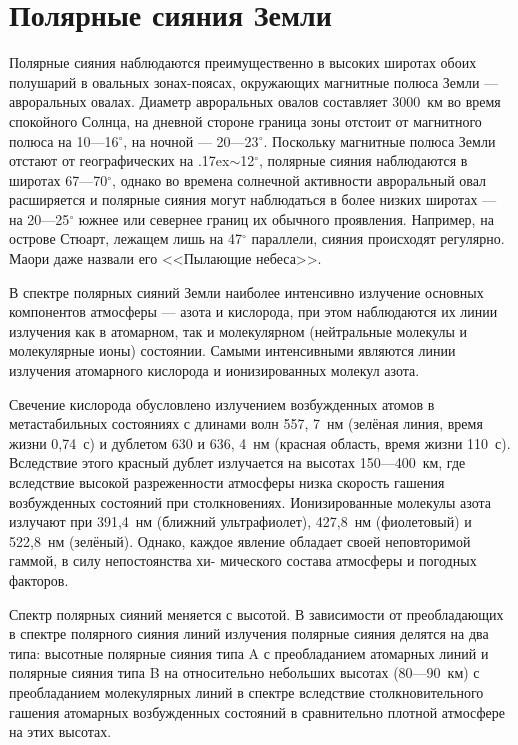 \documentclass[a4paper,14pt]{article}
\newcommand{\tilda}{\raise.17ex\hbox{$\scriptstyle\sim$}}
\begin{document}
\section{Полярные сияния Земли}

Полярные сияния наблюдаются преимущественно в высоких широтах обоих полушарий в овальных зонах-поясах, окружающих магнитные полюса Земли — авроральных овалах. Диаметр авроральных овалов составляет 3000~км во время спокойного Солнца, на дневной стороне граница зоны отстоит от магнитного полюса на 10—16$^\circ$, на ночной — 20—23$^\circ$. Поскольку магнитные полюса Земли отстают от географических на \tilda12$^\circ$, полярные сияния наблюдаются в широтах 67—70$^\circ$, однако во времена солнечной активности авроральный овал расширяется и полярные сияния могут наблюдаться в более низких широтах — на 20—25$^\circ$ южнее или севернее границ их обычного проявления. Например, на острове Стюарт, лежащем лишь на 47$^\circ$ параллели, сияния происходят регулярно. Маори даже назвали его <<Пылающие небеса>>.

В спектре полярных сияний Земли наиболее интенсивно излучение основных компонентов атмосферы — азота и кислорода, при этом наблюдаются их линии излучения как в атомарном, так и молекулярном (нейтральные молекулы и молекулярные ионы) состоянии. Самыми интенсивными являются линии излучения атомарного кислорода и ионизированных молекул азота.

Свечение кислорода обусловлено излучением возбужденных атомов в метастабильных состояниях с длинами волн 557, 7~нм (зелёная линия, время жизни 0,74~с) и дублетом 630 и 636, 4~нм (красная область, время жизни 110~с). Вследствие этого красный дублет излучается на высотах 150—400~км, где вследствие высокой разреженности атмосферы низка скорость гашения возбужденных состояний при столкновениях. Ионизированные молекулы азота излучают при 391,4~нм (ближний ультрафиолет), 427,8~нм (фиолетовый) и 522,8~нм (зелёный). Однако, каждое явление обладает своей неповторимой гаммой, в силу непостоянства хи-
мического состава атмосферы и погодных факторов.

Спектр полярных сияний меняется с высотой. В зависимости от преобладающих в спектре полярного сияния линий излучения полярные сияния делятся на два типа: высотные полярные сияния типа A с преобладанием атомарных линий и полярные сияния типа B на относительно небольших высотах (80—90~км) с преобладанием молекулярных линий в спектре вследствие столкновительного гашения атомарных возбужденных состояний в сравнительно плотной атмосфере на этих высотах. 
\end{document}
